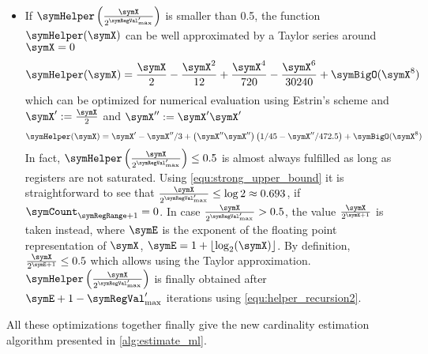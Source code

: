 \documentclass[a4paper]{scrartcl}
\begin{document}
\begin{itemize}
\item If $\symHelper\left(\frac{\symX}{2^{\symRegVal'_\text{max}}}\right)$ is smaller than 0.5, the function $\symHelper(\symX)$ can be well approximated by a Taylor series around $\symX=0$
\begin{equation}
\symHelper(\symX)
=
\frac{\symX}{2} - \frac{\symX^2}{12} +\frac{\symX^4}{720}-\frac{\symX^6}{30240} + \symBigO(\symX^{8})
\end{equation}
which can be optimized for numerical evaluation using Estrin's scheme and $\symX' := \frac{\symX}{2}$ and $\symX'' := \symX' \symX'$
\begin{equation}
\label{equ:taylor}
\symHelper(\symX)
=
\symX' - \symX''/3 + \left(\symX'' \symX''\right)\left(1/45-\symX''/472.5\right)
+ \symBigO(\symX^{8})
\end{equation}
In fact, $\symHelper\left(\frac{\symX}{2^{\symRegVal'_\text{max}}}\right)\leq 0.5$ is almost always fulfilled as long as registers are not saturated. Using \eqref{equ:strong_upper_bound} it is straightforward to see that $\frac{\symX}{2^{\symRegVal'_\text{max}}} \leq \log 2 \approx 0.693$, if $\symCount_{\symRegRange+1}=0$.
In case $\frac{\symX}{2^{\symRegVal'_\text{max}}} > 0.5$, the value $\frac{\symX}{2^{\symE+1}}$ is taken instead, where $\symE$ is the exponent of the floating point representation of $\symX$, $\symE = 1+\lfloor\log_2(\symX)\rfloor$. By definition, $\frac{\symX}{2^{\symE+1}}\leq 0.5$ which allows using the Taylor approximation. $\symHelper\left(\frac{\symX}{2^{\symRegVal'_\text{max}}}\right)$ is finally obtained after $\symE + 1 -\symRegVal'_\text{max}$ iterations using \eqref{equ:helper_recursion2}.
\end{itemize}

All these optimizations together finally give the new cardinality estimation algorithm presented in \cref{alg:estimate_ml}.
\end{document}

